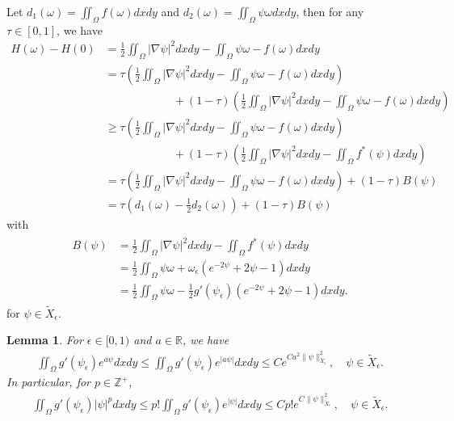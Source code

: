 \documentclass[1 [leqno, 11pt]{amsart}
\numberwithin{equation}{section}
\let\ep=\epsilon
\newtheorem{lemma}[Theorem]{Lemma}
\begin{document}
\begin{CJK*}{GBK}{song}
Let $d_1(\omega) = \iint_{\Omega}f(\omega) dxdy$ and $d_2(\omega) = \iint_{\Omega} \psi \omega dxdy$, then for any $\tau \in [0, 1]$, we have
\begin{align*}
H(\omega) - H(0)
&= \frac 1 2  \iint_{\Omega} |\nabla \psi|^2 dxdy - \iint_{\Omega} \psi \omega - f(\omega) dxdy \\
&= \tau \left(\frac 1 2  \iint_{\Omega} |\nabla \psi|^2 dxdy - \iint_{\Omega} \psi \omega - f(\omega) dxdy \right) \\
&\qquad \qquad \qquad +  (1- \tau) \left(\frac 1 2  \iint_{\Omega} |\nabla \psi|^2 dxdy - \iint_{\Omega} \psi \omega - f(\omega) dxdy \right)\\
&\geq \tau \left(\frac 1 2  \iint_{\Omega} |\nabla \psi|^2 dxdy - \iint_{\Omega} \psi \omega - f(\omega) dxdy \right) \\
&\qquad \qquad \qquad  + (1-\tau)\left(\frac 1 2  \iint_{\Omega} |\nabla \psi|^2 dxdy - \iint_{\Omega} f^*(\psi) dxdy \right) \\
& = \tau \left(\frac 1 2  \iint_{\Omega} |\nabla \psi|^2 dxdy - \iint_{\Omega} \psi \omega - f(\omega) dxdy \right) + (1-\tau)B(\psi)\\
& = \tau\left(d_1(\omega) - \frac 1 2 d_2(\omega)\right) + (1-\tau)B(\psi)
\end{align*}
with
\begin{align}\label{funcB}
\begin{split}
B(\psi) &= \frac 1 2  \iint_{\Omega} |\nabla \psi|^2 dxdy - \iint_{\Omega} f^*(\psi) dxdy \\
& = \frac 1 2 \iint_\Omega \psi\omega + \omega_\ep ( e^{-2\psi} + 2\psi - 1) dxdy \\
& =  \frac 1 2 \iint_\Omega \psi\omega - \frac 1 2 g'(\psi_\ep) ( e^{-2\psi} + 2\psi - 1) dxdy.
\end{split}
\end{align}
for $\psi \in \tilde{X}_\ep$.
\fi
\begin{lemma}\label{Orlicz-type inequlity-lemma}
For $\ep\in[0,1)$ and $a\in\mathbb{R}$, we have
\begin{align}\label{Orlicz-type inequlity}
\iint_\Omega g'(\psi_\ep) e^ {a\psi} dxdy \leq\iint_\Omega g'(\psi_\ep) e^ {|a\psi|} dxdy \leq   C e^{Ca^2\|\psi\|_{\tilde{X}_\ep}^2},\quad\psi \in \tilde{X}_\ep.
\end{align}
In particular, for $p\in\mathbb{Z}^+$,
\begin{align*}\iint_\Omega g'(\psi_\ep) |\psi|^p dxdy \leq p!\iint_\Omega g'(\psi_\ep) e^{|\psi|} dxdy \leq  Cp! e^{C \|\psi\|_{\tilde{X}_\ep}^2},\quad\psi \in \tilde{X}_\ep.\end{align*}

\end{lemma}
\end{CJK*}
\end{document}
